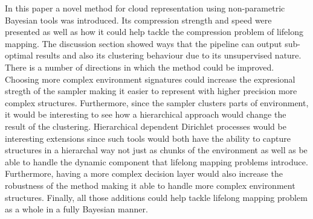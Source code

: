 \documentclass[twoside,hidelinks]{article}
\begin{document}
 In this paper a novel method for cloud representation using non-parametric Bayesian tools was introduced. Its compression strength and speed were presented as well as how it could help tackle the compression problem of lifelong mapping. The discussion section showed ways that the pipeline can output sub-optimal results and also its clustering behaviour due to its unsupervised nature. There is a number of directions in which the method could be improved. Choosing more complex environment signatures could increase the expresional stregth of the sampler making it easier to represent with higher precision more complex structures. Furthermore, since the sampler clusters parts of environment, it would be interesting to see how a hierarchical approach would change the result of the clustering. Hierarchical dependent Dirichlet processes would be interesting extensions since such tools would both have the ability to capture structures in a hierarchal way not just as chunks of the environment as well as be able to handle the dynamic component that lifelong mapping problems introduce. Furthermore, having a more complex decision layer would also increase the robustness of the method making it able to handle more complex environment structures. Finally, all those additions could help tackle lifelong mapping problem as a whole in a fully Bayesian manner.


\end{document}
